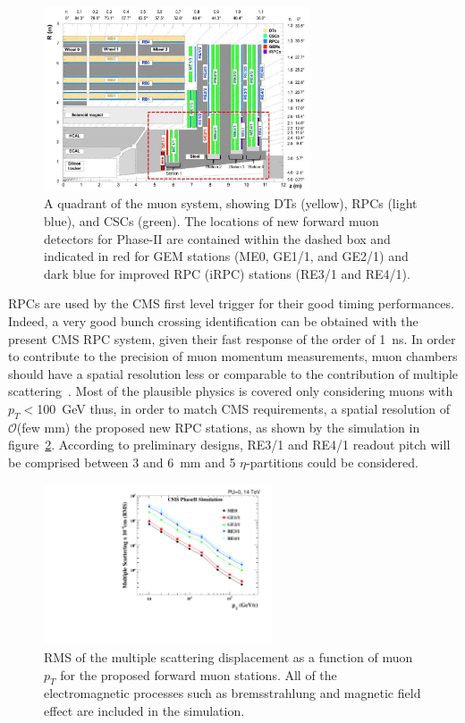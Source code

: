 \begin{figure}[H]
	\centering
	\includegraphics[width=0.7\textwidth]{fig/chapt2/MuonUpgrade-Plans.jpg}
	\caption{\label{fig:Quadrant} A quadrant of the muon system, showing DTs (yellow), RPCs (light blue), and CSCs (green). The locations of new forward muon detectors for Phase-II are contained within the dashed box and indicated in red for GEM stations (ME0, GE1/1, and GE2/1) and dark blue for improved RPC (iRPC) stations (RE3/1 and RE4/1).}
\end{figure}

RPCs are used by the CMS first level trigger for their good timing performances. Indeed, a very good bunch crossing identification can be obtained with the present CMS RPC system, given their fast response of the order of \SI{1}{ns}. In order to contribute to the precision of muon momentum measurements, muon chambers should have a spatial resolution less or comparable to the contribution of multiple scattering~\cite{MUONTDR}. Most of the plausible physics is covered only considering muons with $p_T<$\SI{100}{GeV} thus, in order to match CMS requirements, a spatial resolution of $\mathcal{O}$(few $\mathrm{mm}$) the proposed new RPC stations, as shown by the simulation in figure~\ref{fig:MultiScat}. According to preliminary designs, RE3/1 and RE4/1 readout pitch will be comprised between 3 and \SI{6}{mm} and 5 $\eta$-partitions could be considered.

\begin{figure}[H]
	\centering
	\includegraphics[width=0.6\textwidth]{fig/chapt2/MS_allstations.pdf}
	\caption{\label{fig:MultiScat}  RMS of the multiple scattering displacement as a function of muon $p_T$ for the  proposed forward muon stations. All of the electromagnetic processes such as bremsstrahlung and magnetic field effect are included in the simulation.}
\end{figure}

\clearpage{\pagestyle{empty}\cleardoublepage}
